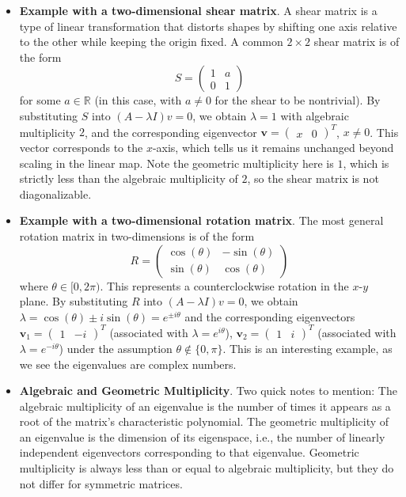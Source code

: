 \documentclass{article}
\begin{document}
\begin{itemize}
    \item \textbf{Example with a two-dimensional shear matrix}. A shear matrix is a type of linear transformation that distorts shapes by shifting one axis relative to the other while keeping the origin fixed. A common $2 \times 2$ shear matrix is of the form
    $$S=\begin{pmatrix}
        1 & a \\
        0 & 1
    \end{pmatrix}$$
    for some $a \in \mathbb{R}$ (in this case, with $a \neq 0$ for the shear to be nontrivial). By substituting $S$ into $(A-\lambda I)v=0$, we obtain $\lambda=1$ with algebraic multiplicity $2$, and the corresponding eigenvector $\textbf{v}=\begin{pmatrix}
        x & 0
    \end{pmatrix}^T$, $x \neq 0$. This vector corresponds to the $x$-axis, which tells us it remains unchanged beyond scaling in the linear map. Note the geometric multiplicity here is $1$, which is strictly less than the algebraic multiplicity of $2$, so the shear matrix is not diagonalizable.
 
    \item \textbf{Example with a two-dimensional rotation matrix}. The most general rotation matrix in two-dimensions is of the form
    $$R= \begin{pmatrix}
        \cos(\theta) & -\sin(\theta) \\
        \sin(\theta) & \cos(\theta)
    \end{pmatrix}$$
    where $\theta \in [0, 2\pi)$. This represents a counterclockwise rotation in the $x$-$y$ plane.  By substituting $R$ into $(A-\lambda I)v=0$, we obtain $\lambda=\cos(\theta)\pm i\sin(\theta)=e^{\pm i\theta}$ and the corresponding eigenvectors $\textbf{v}_1= \begin{pmatrix}
        1 & -i
    \end{pmatrix}^T$ (associated with $\lambda = e^{i\theta}$), $\textbf{v}_2= \begin{pmatrix}
        1 & i
    \end{pmatrix}^T$ (associated with $\lambda = e^{-i\theta}$) under the assumption $\theta \notin \{0, \pi\}$. This is an interesting example, as we see the eigenvalues are complex numbers.
    \item \textbf{Algebraic and Geometric Multiplicity}. Two quick notes to mention: The algebraic multiplicity of an eigenvalue is the number of times it appears as a root of the matrix's characteristic polynomial. The geometric multiplicity of an eigenvalue is the dimension of its eigenspace, i.e., the number of linearly independent eigenvectors corresponding to that eigenvalue. Geometric multiplicity is always less than or equal to algebraic multiplicity, but they do not differ for symmetric matrices.
\end{itemize}
 
\end{document}
